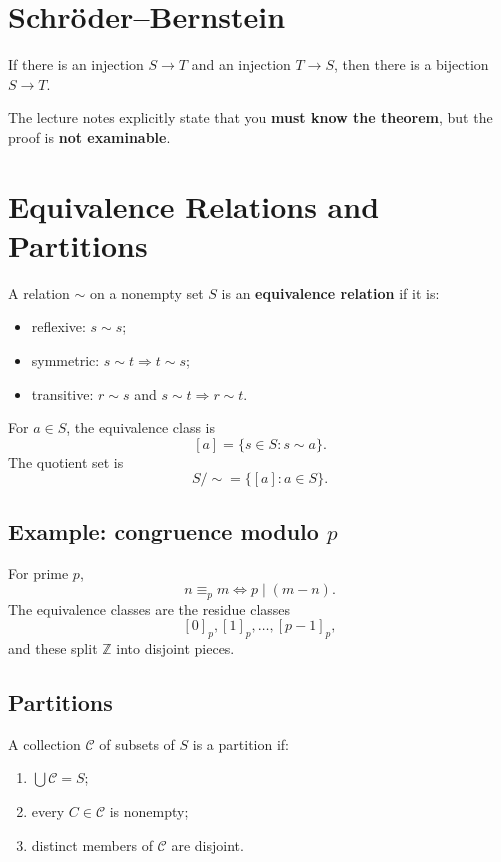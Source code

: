 \documentclass[11pt,a4paper]{article}
\newcommand{\Z}{\mathbb{Z}}
\begin{document}
\section{Schr\"oder--Bernstein}
\begin{theorembox}
If there is an injection $S\to T$ and an injection $T\to S$, then there is a bijection $S\to T$.
\end{theorembox}

\begin{exambox}
The lecture notes explicitly state that you \textbf{must know the theorem}, but the proof is \textbf{not examinable}.
\end{exambox}

\section{Equivalence Relations and Partitions}

\begin{defbox}
A relation $\sim$ on a nonempty set $S$ is an \textbf{equivalence relation} if it is:
\begin{itemize}
\item reflexive: $s\sim s$;
\item symmetric: $s\sim t\Rightarrow t\sim s$;
\item transitive: $r\sim s$ and $s\sim t\Rightarrow r\sim t$.
\end{itemize}
\end{defbox}

For $a\in S$, the equivalence class is
\[
[a]=\{s\in S:s\sim a\}.
\]
The quotient set is
\[
S/\!\sim=\{[a]:a\in S\}.
\]

\subsection{Example: congruence modulo $p$}
For prime $p$,
\[
n\equiv_p m \iff p\mid(m-n).
\]
The equivalence classes are the residue classes
\[
[0]_p,[1]_p,\dots,[p-1]_p,
\]
and these split $\Z$ into disjoint pieces.

\subsection{Partitions}
\begin{defbox}
A collection $\mathcal C$ of subsets of $S$ is a partition if:
\begin{enumerate}
\item $\bigcup \mathcal C=S$;
\item every $C\in\mathcal C$ is nonempty;
\item distinct members of $\mathcal C$ are disjoint.
\end{enumerate}
\end{defbox}
\end{document}
